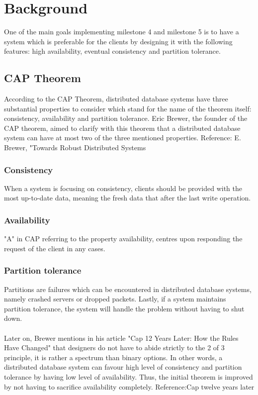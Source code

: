 \section{Background}
\label{sec:background}
One of the main goals implementing milestone 4 and milestone 5 is to have a system which is preferable for the clients by designing it with the following features: high availability, eventual consistency and partition tolerance.

\subsection{CAP Theorem}
\label{sec:backgorund_cap}  %
According to the CAP Theorem, distributed database systems have three substantial properties to consider which stand for the name of the theorem itself: consistency, availability and partition tolerance. Eric Brewer, the founder of the CAP theorem, aimed to clarify with this theorem that a distributed database system can have at most two of the three mentioned properties. Reference: E. Brewer, "Towards Robust Distributed Systems

\subsubsection{Consistency}
\label{sec:backgorund_cap_consistency}
When a system is focusing on consistency, clients should be provided with the most up-to-date data, meaning the fresh data that after the last write operation.

\subsubsection{Availability}
\label{sec:backgorund_cap_avaiability}
"A" in CAP referring to the property availability, centres upon responding the request of the client in any cases.

\subsubsection{Partition tolerance}
\label{sec:backgorund_cap_partitiontolarence}
Partitions are failures which can be encountered in distributed database systems, namely crashed servers or dropped packets. Lastly, if a system maintains partition tolerance, the system will handle the problem without having to shut down.\\
\\
Later on, Brewer mentions in his article "Cap 12 Years Later: How the Rules Have Changed" that designers do not have to abide strictly to the 2 of 3 principle, it is rather a spectrum than binary options. In other words, a distributed database system can favour high level of consistency and partition tolerance by having low level of availability. Thus, the initial theorem is improved by not having to sacrifice availability completely. Reference:Cap twelve years later

